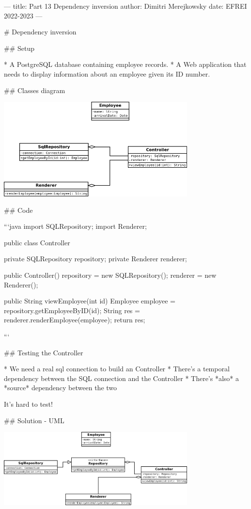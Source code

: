 ---
title: Part 13 Dependency inversion
author: Dimitri Merejkowsky
date: EFREI 2022-2023
---


# Dependency inversion

## Setup

* A PostgreSQL database containing employee records.
* A Web application that needs to display information about an employee
  given its ID number.

## Classes diagram

\includegraphics[width=10cm]{img/uml/employee-render-1.png}

## Code


```java
import SQLRepository;
import Renderer;

public class Controller {
    private SQLRepository repository;
    private Renderer renderer;

    public Controller() {
        repository = new SQLRepository();
        renderer = new Renderer();
    }

    public String viewEmployee(int id) {
        Employee employee = repository.getEmployeeByID(id);
        String res = renderer.renderEmployee(employee);
        return res;
    }
}
```

## Testing the Controller

* We need a real sql connection to build an Controller
* There's a temporal dependency between the SQL connection and the Controller
* There's *also* a *source* dependency between the two

\vfill

It's hard to test!

## Solution - UML


\includegraphics[width=10cm]{img/uml/employee-render-2.png}

